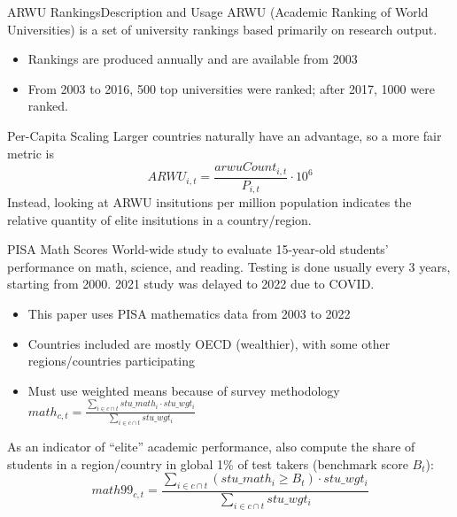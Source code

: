 \documentclass[10pt]{beamer}
\begin{document}
\begin{frame}{ARWU Rankings}{Description and Usage}
    ARWU (Academic Ranking of World Universities) is a set of university rankings based primarily on research output.
    \begin{itemize}
        \item Rankings are produced annually and are available from 2003
        \item From 2003 to 2016, 500 top universities were ranked; after 2017, 1000 were ranked.
    \end{itemize}
    
    \begin{block}{Per-Capita Scaling}
        Larger countries naturally have an advantage, so a more fair metric is
        \[ARWU_{i,t} = \frac{arwuCount_{i,t}}{P_{i,t}} \cdot 10^6 \]
        Instead, looking at ARWU insitutions per million population indicates the relative quantity of elite insitutions in a country/region.
    \end{block}
    
\end{frame}

\begin{frame}{PISA Math Scores}
    World-wide study to evaluate 15-year-old students' performance on math, science, and reading. Testing is done usually every 3 years, starting from 2000. 2021 study was delayed to 2022 due to COVID.

    \begin{itemize}
        \item This paper uses PISA mathematics data from 2003 to 2022
        \item Countries included are mostly OECD (wealthier), with some other regions/countries participating
        \item Must use weighted means because of survey methodology $math_{c, t} = \frac{\sum_{i \in c \cap t} stu\_math_i \cdot stu\_wgt_i}{\sum_{i \in c \cap t} stu\_wgt_i}$
    \end{itemize}

    As an indicator of ``elite'' academic performance, also compute the share of students in a region/country in global 1\% of test takers (benchmark score $B_{t}$):
    \[math99_{c, t} = \frac{\sum_{i \in c \cap t} (stu\_math_i \geq B_t) \cdot stu\_wgt_i}{\sum_{i \in c \cap t} stu\_wgt_i}\]
\end{frame}
\end{document}
